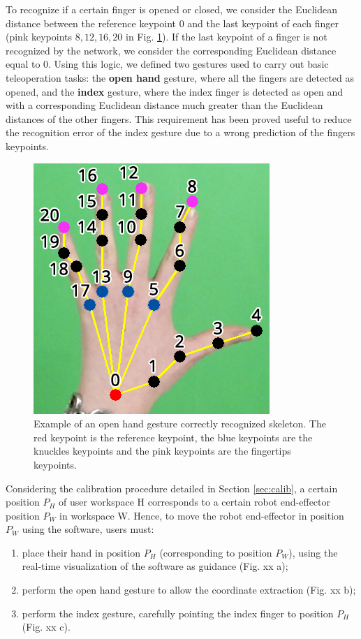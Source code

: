 \documentclass[letterpaper, 10 pt, conference]{ieeeconf}  %
\begin{document}
To recognize if a certain finger is opened or closed, we consider the Euclidean distance between the reference keypoint $0$ and the last keypoint of each finger (pink keypoints $8, 12, 16, 20$ in Fig. \ref{fig:keypoints}). If the last keypoint of a finger is not recognized by the network, we consider the corresponding Euclidean distance equal to $0$. 
Using this logic, we defined two gestures used to carry out basic teleoperation tasks: the \textbf{open hand} gesture, where all the fingers are detected as opened, and the \textbf{index} gesture, where the index finger is detected as open and with a corresponding Euclidean distance much greater than the Euclidean distances of the other fingers. This requirement has been proved useful to reduce the recognition error of the index gesture due to a wrong prediction of the fingers keypoints.

\begin{figure} [h!]
  \centering
  \includegraphics[width=0.7\columnwidth]{figures/hand.png}
  \caption{Example of an open hand gesture correctly recognized skeleton. The red keypoint is the reference keypoint, the blue keypoints are the knuckles keypoints and the pink keypoints are the fingertips keypoints.}
  \label{fig:keypoints}
\end{figure}

Considering the calibration procedure detailed in Section \ref{sec:calib}, a certain position $P_H$ of user workspace H corresponds to a certain robot end-effector position $P_W$ in workspace W. Hence, to move the robot end-effector in position $P_W$  using the software, users must: %
\begin{enumerate}
\item place their hand in position $P_H$ (corresponding to position $P_W$), using the real-time visualization of the software as guidance (Fig. xx a);
\item perform the open hand gesture to allow the coordinate extraction (Fig. xx b);
\item perform the index gesture, carefully pointing the index finger to position $P_H$ (Fig. xx c).
\end{enumerate}
\end{document}
